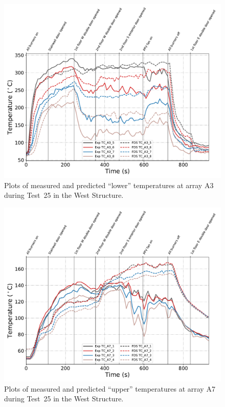 \begin{figure}[!h]
	\centering
	\includegraphics[width=\columnwidth]{Figures/Plots/Validation/Temperature/Test_25_TC_A3_lower}
	\caption{Plots of measured and predicted ``lower'' temperatures at array A3 during Test~25 in the West Structure.}
	\label{fig:TCA3_lower_data_Test25}
\end{figure}

\begin{figure}[!h]
	\centering
	\includegraphics[width=\columnwidth]{Figures/Plots/Validation/Temperature/Test_25_TC_A7_upper}
	\caption{Plots of measured and predicted ``upper'' temperatures at array A7 during Test~25 in the West Structure.}
	\label{fig:TCA7_upper_data_Test25}
\end{figure}

